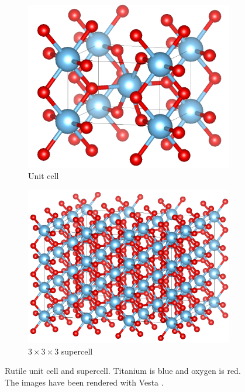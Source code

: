 \begin{figure}
    \centering
    \begin{subfigure}[t]{0.48\textwidth}
        \centering
        \includegraphics[width=1\textwidth]{figures/rutile.png}
        \caption{Unit cell}
        \label{fig:rutile}
    \end{subfigure}
    \hfill
    \begin{subfigure}[t]{0.48\textwidth}
        \centering
        \includegraphics[width=1\textwidth]{figures/supercell.png}
        \caption{$3\times3\times3$ supercell}
        \label{fig:supercell}
    \end{subfigure}
    \caption[Rutile unit cell and supercell]{Rutile unit cell and supercell. Titanium is blue and oxygen is red. The images have been rendered with Vesta \cite{zotero-174}.}
\end{figure}
